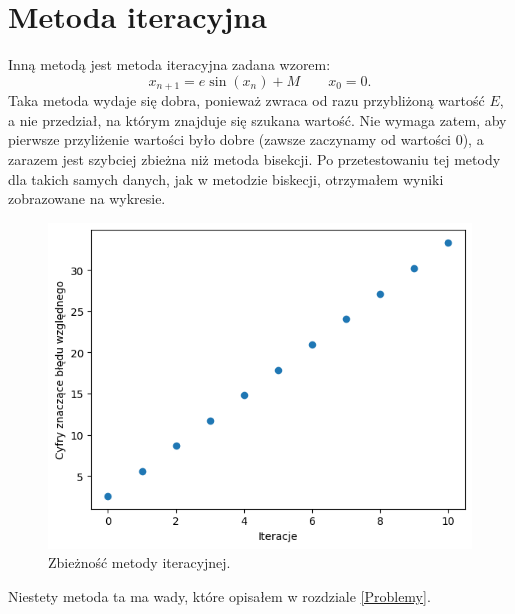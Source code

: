 \documentclass[11pt,wide]{mwart}
\begin{document}
\section{Metoda iteracyjna} \label{Iteracja}
Inną metodą jest metoda iteracyjna zadana wzorem:
\begin{equation}
x_{n+1} = e \sin(x_n) + M \qquad x_0 = 0.
\end{equation}
Taka metoda wydaje się dobra, ponieważ zwraca od razu przybliżoną wartość $E$, a nie przedział, na którym znajduje się szukana wartość. Nie wymaga zatem, aby pierwsze przyliżenie wartości było dobre (zawsze zaczynamy od wartości 0), a zarazem jest szybciej zbieżna niż metoda bisekcji. Po przetestowaniu tej metody dla takich samych danych, jak w metodzie biskecji, otrzymałem wyniki zobrazowane na wykresie.\\
\begin{figure}[H]
	\begin{center}
	\includegraphics[scale=0.6]{iteracja}
	\end{center}
	\caption{Zbieżność metody iteracyjnej.}
\end{figure}
Niestety metoda ta ma wady, które opisałem w rozdziale \ref{Problemy}.
\end{document}
